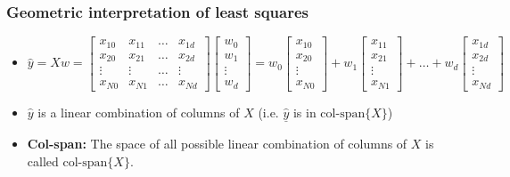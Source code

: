     \subsubsection{Geometric interpretation of least squares}
    \begin{intuition}
        \begin{itemize}
            \item \[
                    \hat{y} = X w = 
                    \begin{bmatrix}
                    x_{10} & x_{11} & \dots & x_{1d} \\
                    x_{20} & x_{21} & \dots & x_{2d} \\
                    \vdots & \vdots & \dots & \vdots \\
                    x_{N0} & x_{N1} & \dots & x_{Nd}
                    \end{bmatrix}
                    \begin{bmatrix}
                    w_0 \\
                    w_1 \\
                    \vdots \\
                    w_d
                    \end{bmatrix}
                    = w_0 
                    \begin{bmatrix}
                    x_{10} \\
                    x_{20} \\
                    \vdots \\
                    x_{N0}
                    \end{bmatrix}
                    + w_1 
                    \begin{bmatrix}
                    x_{11} \\
                    x_{21} \\
                    \vdots \\
                    x_{N1}
                    \end{bmatrix}
                    + \dots + w_d 
                    \begin{bmatrix}
                    x_{1d} \\
                    x_{2d} \\
                    \vdots \\
                    x_{Nd}
                    \end{bmatrix}
                    \]
            \item $\hat{y}$ is a linear combination of columns of $X$ (i.e. $\underline{\hat{y}}$ is in $\text{col-span}\{X\}$)
            \item \textbf{Col-span:} The space of all possible linear combination of columns of $X$ is called $\text{col-span}\{X\}$.
        \end{itemize}
    \end{intuition}

